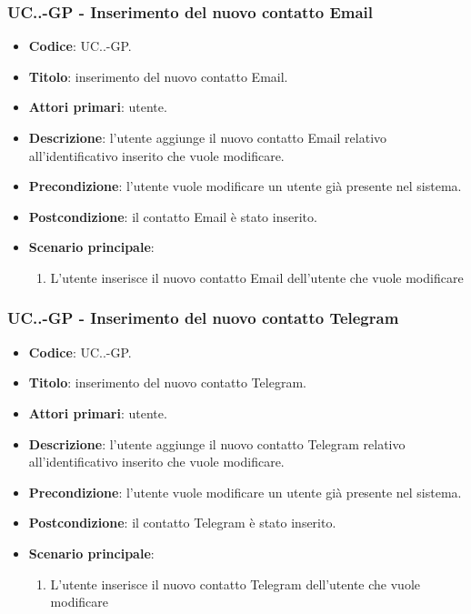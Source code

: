 			\subsubsection{UC\theuccount.\thesubuccount.\thesubsubuccount-GP - Inserimento del nuovo contatto Email}
				\begin{itemize}
					\item \textbf{Codice}: UC\theuccount.\thesubuccount.\thesubsubuccount-GP.
					\item \textbf{Titolo}: inserimento del nuovo contatto Email.
					\item \textbf{Attori primari}: utente.
					\item \textbf{Descrizione}: l'utente aggiunge il nuovo contatto Email relativo all'identificativo inserito che vuole modificare.
					\item \textbf{Precondizione}: l'utente vuole modificare un utente già presente nel sistema.
					\item \textbf{Postcondizione}: il contatto Email è stato inserito.
					\item \textbf{Scenario principale}:
					\begin{enumerate}
						\item L'utente inserisce il nuovo contatto Email dell'utente che vuole modificare
					\end{enumerate}
				\end{itemize}

			\subsubsection{UC\theuccount.\thesubuccount.\thesubsubuccount-GP - Inserimento del nuovo contatto Telegram}

				\begin{itemize}
					\item \textbf{Codice}: UC\theuccount.\thesubuccount.\thesubsubuccount-GP.
					\item \textbf{Titolo}: inserimento del nuovo contatto Telegram.
					\item \textbf{Attori primari}: utente.
					\item \textbf{Descrizione}: l'utente aggiunge il nuovo contatto Telegram relativo all'identificativo inserito che vuole modificare.
					\item \textbf{Precondizione}: l'utente vuole modificare un utente già presente nel sistema.
					\item \textbf{Postcondizione}: il contatto Telegram è stato inserito.
					\item \textbf{Scenario principale}:
					\begin{enumerate}
						\item L'utente inserisce il nuovo contatto Telegram dell'utente che vuole modificare
					\end{enumerate}
				\end{itemize}

